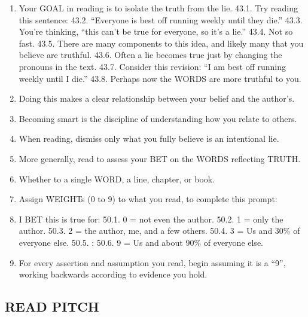 \documentclass[
]{book}
\begin{document}
\begin{enumerate}
\def\labelenumi{\arabic{enumi}.}
\setcounter{enumi}{42}
\item
  Your GOAL in reading is to isolate the truth from the lie.
  43.1. Try reading this sentence:
  43.2. ``Everyone is best off running weekly until they die.''
  43.3. You're thinking, ``this can't be true for everyone, so it's a lie.''
  43.4. Not so fast.
  43.5. There are many components to this idea, and likely many that you believe
  are truthful.
  43.6. Often a lie becomes true just by changing the pronouns in the text.
  43.7. Consider this revision: ``I am best off running weekly until I die.''
  43.8. Perhaps now the WORDS are more truthful to you.
\item
  Doing this makes a clear relationship between your belief and the author's.
\item
  Becoming smart is the discipline of understanding how you relate to others.
\item
  When reading, dismiss only what you fully believe is an intentional lie.
\item
  More generally, read to assess your BET on the WORDS reflecting TRUTH.
\item
  Whether to a single WORD, a line, chapter, or book.
\item
  Assign WEIGHTs (0 to 9) to what you read, to complete this prompt:
\item
  I BET this is true for:
  50.1. 0 = not even the author.
  50.2. 1 = only the author.
  50.3. 2 = the author, me, and a few others.
  50.4. 3 = Us and 30\% of everyone else.
  50.5. :
  50.6. 9 = Us and about 90\% of everyone else.
\item
  For every assertion and assumption you read, begin assuming it is a ``9'', working
  backwards according to evidence you hold.
\end{enumerate}

\hypertarget{read-pitch}{%
\subsection{READ PITCH}\label{read-pitch}}
\end{document}
